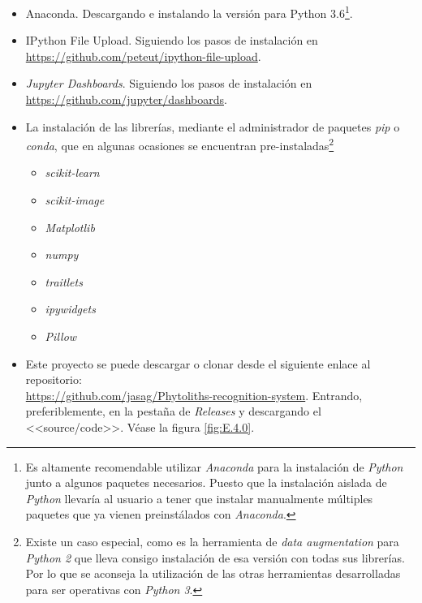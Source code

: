 \begin{itemize}
	\item Anaconda. Descargando e instalando la versión para Python 3.6\footnote{Es altamente recomendable utilizar \textit{Anaconda} para la instalación de \textit{Python} junto a algunos paquetes necesarios. Puesto que la instalación aislada de \textit{Python} llevaría al usuario a tener que instalar manualmente múltiples paquetes que ya vienen preinstálados con \textit{Anaconda}.}.

	\item IPython File Upload. Siguiendo los pasos de instalación en \url{https://github.com/peteut/ipython-file-upload}.

	\item \textit{Jupyter Dashboards}. Siguiendo los pasos de instalación en \url{https://github.com/jupyter/dashboards}.
	
	\item La instalación de las librerías, mediante el administrador de paquetes \textit{pip} o \textit{conda}, que en algunas ocasiones se encuentran pre-instaladas\footnote{Existe un caso especial, como es la herramienta de \textit{data augmentation} para \textit{Python 2} que lleva consigo instalación de esa versión con todas sus librerías. Por lo que se aconseja la utilización de las otras herramientas desarrolladas para ser operativas con \textit{Python 3}.}
	\begin{multicols}{2}
	\begin{itemize}
		\item \textit{scikit-learn}
		\item \textit{scikit-image}
		\item \textit{Matplotlib}
		\item \textit{numpy}
		\item \textit{traitlets}
		\item \textit{ipywidgets}
		\item \textit{Pillow}
	\end{itemize}
	\end{multicols}
	\item Este proyecto se puede descargar o clonar desde el siguiente enlace al repositorio:\\ \url{https://github.com/jasag/Phytoliths-recognition-system}. Entrando, preferiblemente, en la pestaña de \textit{Releases} y descargando el <<source/code>>. Véase la figura \ref{fig:E.4.0}.

\end{itemize}

